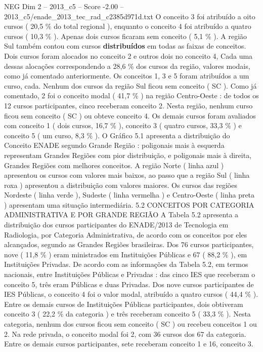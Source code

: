 \begin{textsample}{NEG Dim 2 – 2013\_c5 – Score -2.00 – 2013\_c5/enade\_2013\_tec\_rad\_c2385d971d.txt}
O conceito 3 foi atribuído a oito cursos ( 20,5 \% do total regional ), enquanto o conceito 4 foi atribuído a quatro cursos ( 10,3 \% ).
Apenas dois cursos ficaram sem conceito ( 5,1 \% ).
A região Sul também contou com cursos \textbf{distribuídos} em todas as faixas de conceitos.
Dois cursos foram alocados no conceito 2 e outros dois no conceito 4, Cada uma dessas alocações correspondendo a 28,6 \% dos cursos da região, valores modais, como já comentado anteriormente.
Os conceitos 1, 3 e 5 foram atribuídos a um curso, cada.
Nenhum dos cursos da região Sul ficou sem conceito ( SC ).
Como já comentado, 2 foi o conceito modal ( 41,7 \% ) na região Centro-Oeste : de todos os 12 cursos participantes, cinco receberam conceito 2.
Nesta região, nenhum curso ficou sem conceito ( SC ) ou obteve conceito 4.
Os demais cursos foram avaliados com conceito 1 ( dois cursos, 16,7 \% ), conceito 3 ( quatro cursos, 33,3 \% ) e conceito 5 ( um curso, 8,3 \% ).
O Gráfico 5.1 apresenta a distribuição do Conceito ENADE segundo Grande Região : poligonais mais à esquerda representam Grandes Regiões com pior distribuição, e poligonais mais à direita, Grandes Regiões com melhores conceitos.
A região Norte ( linha azul ) apresentou os cursos com valores mais baixos, ao passo que a região Sul ( linha roxa ) apresentou a distribuição com valores maiores.
Os cursos das regiões Nordeste ( linha verde ), Sudeste ( linha vermelha ) e Centro-Oeste ( linha preta ) apresentam uma situação intermediária. 5.2 CONCEITOS POR CATEGORIA ADMINISTRATIVA E POR GRANDE REGIÃO A Tabela 5.2 apresenta a distribuição dos cursos participantes do ENADE/2013 de Tecnologia em Radiologia, por Categoria Administrativa, de acordo com os conceitos por eles alcançados, segundo as Grandes Regiões brasileiras.
Dos 76 cursos participantes, nove ( 11,8 \% ) eram ministrados em Instituições Públicas e 67 ( 88,2 \% ), em Instituições Privadas.
De acordo com as informações da Tabela 5.2, em termos nacionais, entre Instituições Públicas e Privadas : das cinco IES que receberam o conceito 5, três eram Públicas e duas Privadas.
Dos nove cursos participantes de IES Públicas, o conceito 4 foi o valor modal, atribuído a quatro cursos ( 44,4 \% ).
Entre os demais cursos de Instituições Públicas participantes, dois obtiveram conceito 3 ( 22,2 \% da categoria ) e três receberam conceito 5 ( 33,3 \% ).
Nesta categoria, nenhum dos cursos ficou sem conceito ( SC ) ou recebeu conceitos 1 ou 2.
Na rede privada, o conceito modal foi 2, com 36 cursos dos 67 da categoria.
Entre os demais cursos participantes, sete receberam conceito 1 e 16, conceito 3.

\end{textsample}

